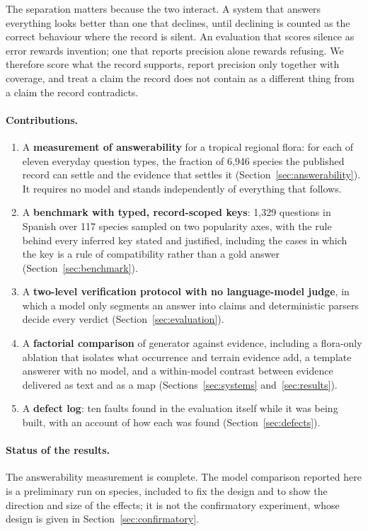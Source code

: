 \documentclass[11pt,a4paper]{article}
\begin{document}
The separation matters because the two interact. A system that answers everything
looks better than one that declines, until declining is counted as the correct
behaviour where the record is silent. An evaluation that scores silence as error
rewards invention; one that reports precision alone rewards refusing. We therefore
score what the record supports, report precision only together with coverage, and
treat a claim the record does not contain as a different thing from a claim the
record contradicts.

\paragraph{Contributions.}
\begin{enumerate}
  \item A \textbf{measurement of answerability} for a tropical regional flora: for
        each of eleven everyday question types, the fraction of 6{,}946 species the
        published record can settle and the evidence that settles it
        (Section~\ref{sec:answerability}). It requires no model and stands
        independently of everything that follows.
  \item A \textbf{benchmark with typed, record-scoped keys}: 1{,}329 questions in
        Spanish over 117 species sampled on two popularity axes, with the rule behind
        every inferred key stated and justified, including the cases in which the key
        is a rule of compatibility rather than a gold answer
        (Section~\ref{sec:benchmark}).
  \item A \textbf{two-level verification protocol with no language-model judge}, in
        which a model only segments an answer into claims and deterministic parsers
        decide every verdict (Section~\ref{sec:evaluation}).
  \item A \textbf{factorial comparison} of generator against evidence, including a
        flora-only ablation that isolates what occurrence and terrain evidence add, a
        template answerer with no model, and a within-model contrast between evidence
        delivered as text and as a map (Sections~\ref{sec:systems}
        and~\ref{sec:results}).
  \item A \textbf{defect log}: ten faults found in the evaluation itself while it was
        being built, with an account of how each was found
        (Section~\ref{sec:defects}).
\end{enumerate}

\paragraph{Status of the results.} The answerability measurement is complete. The
model comparison reported here is a preliminary run on \RunSpecies{} species,
included to fix the design and to show the direction and size of the effects; it is
not the confirmatory experiment, whose design is given in
Section~\ref{sec:confirmatory}.
\end{document}
